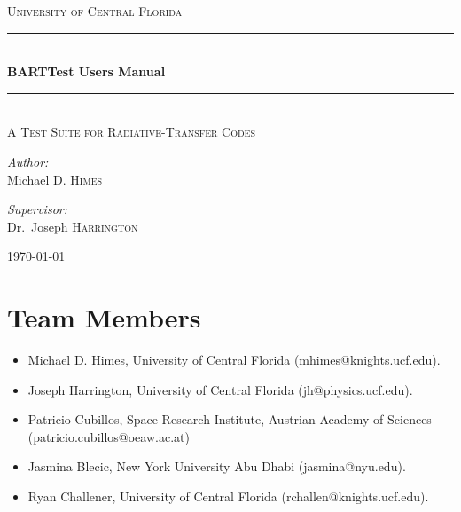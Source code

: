\documentclass[letterpaper, 12pt]{article}
\begin{document}
\begin{titlepage}
\begin{center}

\textsc{\LARGE University of Central Florida}\\[1.5cm]

\rule{\linewidth}{0.5mm} \\[0.4cm]
{ \huge \bfseries BARTTest Users Manual \\[0.4cm] }
\rule{\linewidth}{0.5mm} \\[1.0cm]

\textsc{\Large A Test Suite for Radiative-Transfer Codes}\\[1.5cm]

\noindent
\begin{minipage}{0.4\textwidth}
\begin{flushleft} \large
\emph{Author:}\\
Michael D. \textsc{Himes}\\
\end{flushleft}
\end{minipage}%
\begin{minipage}{0.4\textwidth}
\begin{flushright} \large
\emph{Supervisor:} \\
Dr.~Joseph \textsc{Harrington}
\end{flushright}
\end{minipage}

\vfill

{\large \today}

\end{center}
\end{titlepage}

\tableofcontents

\newpage

\section{Team Members}
\label{sec:team}

\begin{itemize}
\item Michael D. Himes, University of Central Florida (mhimes@knights.ucf.edu).
\item Joseph Harrington, University of Central Florida (jh@physics.ucf.edu).
\item Patricio Cubillos, Space Research Institute, Austrian Academy of Sciences (patricio.cubillos@oeaw.ac.at)
\item Jasmina Blecic, New York University Abu Dhabi (jasmina@nyu.edu).
\item Ryan Challener, University of Central Florida (rchallen@knights.ucf.edu).
\end{itemize}
\end{document}
